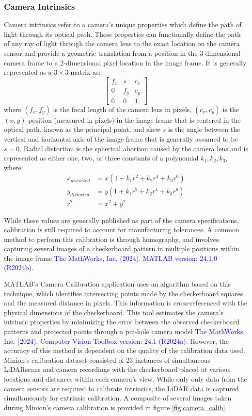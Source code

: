 \subsubsection{Camera Intrinsics}

Camera intrinsics refer to a camera's unique properties which define the path of light through its optical path.
These properties can functionally define the path of any ray of light through the camera lens to the exact location on the camera sensor and provide a geometric translation from a position in the 3-dimensional camera frame to a 2-dimensional pixel location in the image frame. 
It is generally represented as a $3 \times 3$ matrix as:
$$
\begin{bmatrix}
    f_x & s & c_x \\
    0 & f_y & c_y \\
    0 & 0 & 1
\end{bmatrix}
$$
where $(f_x, f_y)$ is the focal length of the camera lens in pixels, $(c_x, c_y)$ is the $(x,y)$ position (measured in pixels) in the image frame that is centered in the optical path, known as the principal point, and skew $s$ is the angle between the vertical and horizontal axis of the image frame that is generally assumed to be $s = 0$. 
Radial distortion is the spherical abortion caused by the camera lens and is represented as either one, two, or three constants of a polynomial $k_1,k_2,k_3$, where:
\begin{align*}
x_{distorted} & = x(1+k_1r^2+k_2r^4+k_3r^6)\\
y_{distorted} & = y(1+k_1r^2+k_2r^4+k_3r^6)\\
r^2 & = x^2+y^2
\end{align*}

While these values are generally published as part of the camera specifications, calibration is still required to account for manufacturing tolerances. A common method to perform this calibration is through homography, and involves capturing several images of a checkerboard pattern in multiple positions within the image frame \textcolor{blue}{The MathWorks, Inc. (2024). MATLAB version: 24.1.0 (R2024b)}.

MATLAB's Camera Calibration application uses an algorithm based on this technique, which identifies intersecting points made by the checkerboard squares and the measured distance in pixels. 
This information is cross-referenced with the physical dimensions of the checkerboard.
This tool estimates the camera's intrinsic properties by minimizing the error between the observed checkerboard patterns and projected points through a pin-hole camera model \textcolor{blue}{The MathWorks, Inc. (2024). Computer Vision Toolbox version: 24.1 (R2024a)}.
However, the accuracy of this method is dependent on the quality of the calibration data used. 
Minion's calibration dataset consisted of 23 instances of simultaneous LiDARscans and camera recordings with the checkerboard placed at various locations and distances within each camera's view. 
While only only data from the camera sensors are required to calibrate intrinsics, the LiDAR data is captured simultaneously for extrinsic calibration.
A composite of several images taken during Minion's camera calibration is provided in figure \ref{fig:camera_calib}.


